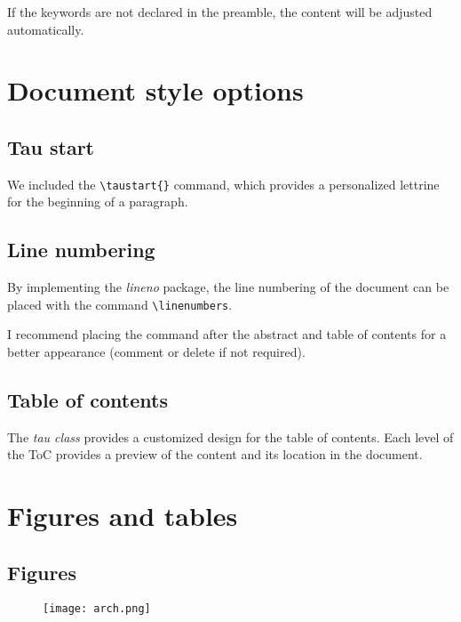 \documentclass[9pt,a4paper,twoside]{tau-class/tau}
\begin{document}
    If the keywords are not declared in the preamble, the content will be adjusted automatically.
    
\section{Document style options}

    \subsection{Tau start}
	
        We included the \verb|\taustart{}| command, which provides a personalized lettrine for the beginning of a paragraph.

    \subsection{Line numbering}
	
        By implementing the \textit{lineno} package, the line numbering of the document can be placed with the command \verb|\linenumbers|. 
		
        I recommend placing the command after the abstract and table of contents for a better appearance (comment or delete if not required).
		
    \subsection{Table of contents}
	
        The \textit{tau class} provides a customized design for the table of contents. Each level of the ToC provides a preview of the content and its location in the document. 
		
\section{Figures and tables}

    \subsection{Figures}
		
		
	\begin{figure}[H]
		\centering
		\texttt{[image: arch.png]}
		\label{fig:figure}
	\end{figure}
		
\end{document}
